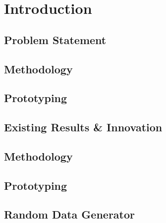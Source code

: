 \chapter{Introduction}\label{ch:introduction}


\section{Problem Statement}



\section{Methodology}


\section{Prototyping}

\section {Existing Results \& Innovation}\label{sec:existing_results_innovation}


\section{Methodology}\label{sec:methodology}

\section{Prototyping}\label{sec:prototyping}

\section{Random Data Generator}\label{sec:random_data_generator}
